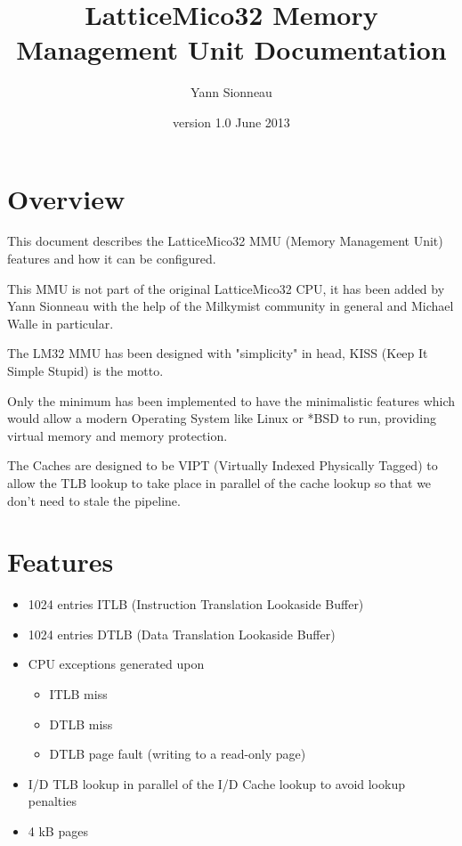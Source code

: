 \documentclass[a4paper,11pt]{article}
\title{LatticeMico32 Memory Management Unit Documentation}
\author{Yann Sionneau}
\date{version 1.0 June 2013}
\begin{document}
\setlength{\parindent}{0pt}
\setlength{\parskip}{5pt}
\maketitle{}

\tableofcontents

\section{Overview}

This document describes the LatticeMico32 MMU (Memory Management Unit) features and how it can be configured.

This MMU is not part of the original LatticeMico32 CPU, it has been added by Yann Sionneau with the help of the Milkymist community in general and Michael Walle in particular.

The LM32 MMU has been designed with "simplicity" in head, KISS (Keep It Simple Stupid) is the motto.

Only the minimum has been implemented to have the minimalistic features which would allow a modern Operating System like Linux or *BSD to run, providing virtual memory and memory protection.

The Caches are designed to be VIPT (Virtually Indexed Physically Tagged) to allow the TLB lookup to take place in parallel of the cache lookup so that we don't need to stale the pipeline.

\section{Features}

\begin{itemize}
	\item 1024 entries ITLB (Instruction Translation Lookaside Buffer)
	\item 1024 entries DTLB (Data Translation Lookaside Buffer)
	\item CPU exceptions generated upon
	\begin{itemize}
			\item ITLB miss
			\item DTLB miss
			\item DTLB page fault (writing to a read-only page)
	\end{itemize}
	\item I/D TLB lookup in parallel of the I/D Cache lookup to avoid lookup penalties
	\item 4 kB pages
\end{itemize}
\end{document}
